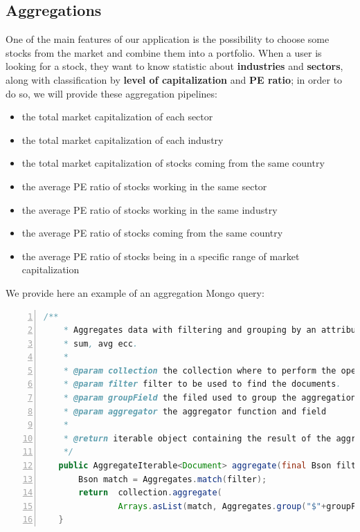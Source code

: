 \subsection{Aggregations}
One of the main features of our application is the possibility to choose some stocks from
the market and combine them into a portfolio. When a user is looking for a stock, they want to
know statistic about \textbf{industries} and \textbf{sectors}, along with classification by 
\textbf{level of capitalization} and  \textbf{PE ratio}; in order to do so, we will provide
these aggregation pipelines:
\begin{itemize}
    \item the total market capitalization of each sector
    \item the total market capitalization of each industry
    \item the total market capitalization of stocks coming from the same country
    \item the average PE ratio of stocks working in the same sector
    \item the average PE ratio of stocks working in the same industry
    \item the average PE ratio of stocks coming from the same country
    \item the average PE ratio of stocks being in a specific range of market capitalization
\end{itemize}
We provide here an example of an aggregation Mongo query:
\begin{lstlisting}[basicstyle=\footnotesize,language=Java,numbers=left,
    numberstyle=\footnotesize,numbersep=4pt,frame=single]
    /**
    * Aggregates data with filtering and grouping by an attribute, can compute
    * sum, avg ecc.
    *
    * @param collection the collection where to perform the operation;
    * @param filter filter to be used to find the documents.
    * @param groupField the filed used to group the aggregation
    * @param aggregator the aggregator function and field
    *
    * @return iterable object containing the result of the aggregation.
    */
   public AggregateIterable<Document> aggregate(final Bson filter, final String groupField, final BsonField aggregator, final MongoCollection<Document> collection) {
       Bson match = Aggregates.match(filter);
       return  collection.aggregate(
               Arrays.asList(match, Aggregates.group("$"+groupField, aggregator)));
   }
\end{lstlisting}
